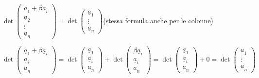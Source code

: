   \begin{corollario}
    \phantom{text}\\
    $\det
    \begin{pmatrix}
      \underline{a}_1+\beta\underline{a}_i\\
      \underline{a}_2\\
      \vdots\\
      \underline{a}_n
    \end{pmatrix}=\det
    \begin{pmatrix}
      \underline{a}_1\\
      \vdots\\
      \underline{a}_n
    \end{pmatrix}$(stessa formula anche per le colonne)
    \begin{dimostrazione}
      $\det
      \begin{pmatrix}
        \underline{a}_1+\beta\underline{a}_i\\
        \underline{a}_i\\
        \underline{a}_n
      \end{pmatrix}=\det
      \begin{pmatrix}
        \underline{a}_1\\
        \underline{a}_i\\
        \underline{a}_n
      \end{pmatrix}+\det
      \begin{pmatrix}
        \beta\underline{a}_i\\
        \underline{a}_i\\
        \underline{a}_n
      \end{pmatrix}=\det
      \begin{pmatrix}
        \underline{a}_1\\
        \underline{a}_i\\
        \underline{a}_n
      \end{pmatrix}+0=\det
      \begin{pmatrix}
        \underline{a}_1\\
        \vdots\\
        \underline{a}_n
      \end{pmatrix}$
    \end{dimostrazione}
\end{corollario}
